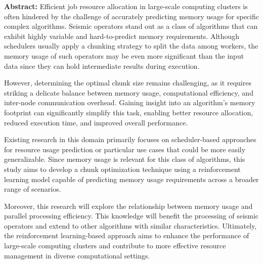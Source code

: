 \textbf{Abstract:} Efficient job resource allocation in large-scale computing clusters is often hindered by the challenge of accurately predicting memory usage for specific complex algorithms.
Seismic operators stand out as a class of algorithms that can exhibit highly variable and hard-to-predict memory requirements.
Although schedulers usually apply a chunking strategy to split the data among workers, the memory usage of such operators may be even more significant than the input data since they can hold intermediate results during execution.

However, determining the optimal chunk size remains challenging, as it requires striking a delicate balance between memory usage, computational efficiency, and inter-node communication overhead.
Gaining insight into an algorithm's memory footprint can significantly simplify this task, enabling better resource allocation, reduced execution time, and improved overall performance.

Existing research in this domain primarily focuses on scheduler-based approaches for resource usage prediction or particular use cases that could be more easily generalizable.
Since memory usage is relevant for this class of algorithms, this study aims to develop a chunk optimization technique using a reinforcement learning model capable of predicting memory usage requirements across a broader range of scenarios.

Moreover, this research will explore the relationship between memory usage and parallel processing efficiency.
This knowledge will benefit the processing of seismic operators and extend to other algorithms with similar characteristics.
Ultimately, the reinforcement learning-based approach aims to enhance the performance of large-scale computing clusters and contribute to more effective resource management in diverse computational settings.
